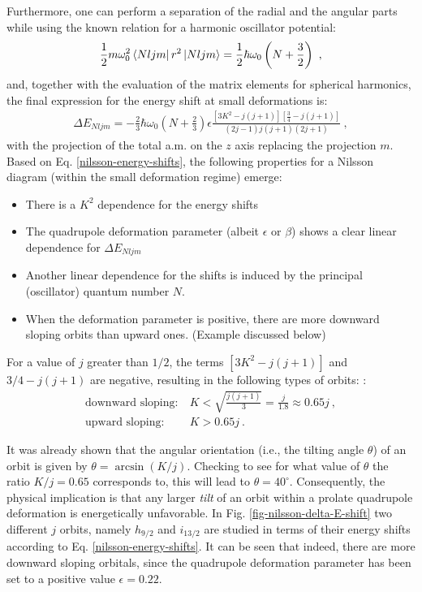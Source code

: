 Furthermore, one can perform a separation of the radial and the angular parts while using the known relation for a harmonic oscillator potential:
\begin{align}
    \frac{1}{2}m\omega_0^2\bra{Nljm}r^2\ket{Nljm}=\frac{1}{2}\hbar\omega_0\left(N+\frac{3}{2}\right)\ ,
\end{align}
and, together with the evaluation of the matrix elements for spherical harmonics, the final expression for the energy shift at small deformations is:
\begin{align}
    \Delta E_{Nljm}=-\frac{2}{3}\hbar\omega_0\left(N+\frac{2}{3}\right)\epsilon\frac{\left[3K^2-j(j+1)\right]\left[\frac{3}{4}-j(j+1)\right]}{(2j-1)j(j+1)(2j+1)}\ ,
    \label{nilsson-energy-shifts}
\end{align}
with the projection of the total a.m. on the $z$ axis replacing the projection $m$. Based on Eq. \ref{nilsson-energy-shifts}, the following properties for a Nilsson diagram (within the small deformation regime) emerge:
\begin{itemize}
    \item There is a $K^2$ dependence for the energy shifts
    \item The quadrupole deformation parameter (albeit $\epsilon$ or $\beta$) shows a clear linear dependence for $\Delta E_{Nljm}$
    \item Another linear dependence for the shifts is induced by the principal (oscillator) quantum number $N$.
    \item When the deformation parameter is positive, there are more downward sloping orbits than upward ones. (Example discussed below)
\end{itemize}

For a value of $j$ greater than $1/2$, the terms $\left[3K^2-j(j+1)\right]$ and $3/4-j(j+1)$ are negative, resulting in the following types of orbits: \cite{krane1991introductory}:
\begin{align}
    \text{downward sloping:}&\ K<\sqrt{\frac{j(j+1)}{3}}=\frac{j}{1.8}\approx 0.65j\ ,\\
    \text{upward sloping:}&\ K>0.65j\ .
\end{align}

It was already shown that the angular orientation (i.e., the tilting angle $\theta$) of an orbit is given by $\theta=\arcsin(K/j)$. Checking to see for what value of $\theta$ the ratio $K/j=0.65$ corresponds to, this will lead to $\theta=40^\circ$. Consequently, the physical implication is that any larger \emph{tilt} of an orbit within a prolate quadrupole deformation is energetically unfavorable. In Fig. \ref{fig-nilsson-delta-E-shift} two different $j$ orbits, namely $h_{9/2}$ and $i_{13/2}$ are studied in terms of their energy shifts according to Eq. \ref{nilsson-energy-shifts}. It can be seen that indeed, there are more downward sloping orbitals, since the quadrupole deformation parameter has been set to a positive value $\epsilon=0.22$.

